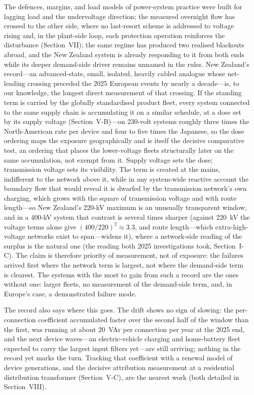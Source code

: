\documentclass[journal]{IEEEtran}
\begin{document}
The defences,
margins, and load models of power-system practice were built for lagging load and
the undervoltage direction; the measured overnight flow has crossed to the other
side, where no last-resort scheme is addressed to voltage rising and, in the
plant-side loop, each protection operation reinforces the disturbance
(Section~VII); the same regime
has produced two realised blackouts abroad, and the New Zealand system is
already responding to it from both ends while its deeper demand-side driver
remains unnamed in the rules. New Zealand's record---an advanced-state, small,
isolated, heavily cabled analogue whose net-leading crossing preceded the 2025
European events by nearly a decade---is, to our knowledge, the longest direct
measurement of that crossing. If the standing term is carried by the
globally standardised product fleet, every system connected to the same supply
chain is accumulating it on a similar schedule, at a dose set by its supply
voltage (Section~V-B)---on 230-volt systems roughly three times the
North-American rate per device and four to five times the Japanese, so the
dose ordering maps the exposure geographically and is itself the decisive
comparative test, an ordering that places the lower-voltage fleets
structurally later on the same accumulation, not exempt from it. Supply
voltage sets the dose; transmission voltage sets its visibility. The term is
created at the mains, indifferent to the network above it, while in any system-wide reactive account the boundary flow that would reveal it is dwarfed by the transmission network's own charging, which grows with the square of transmission voltage and with route length---so New Zealand's 220-kV maximum is an unusually transparent window, and in a 400-kV system that contrast is several times sharper
(against 220~kV the voltage terms alone give $(400/220)^2\approx3.3$, and
route length---which extra-high-voltage networks exist to span---widens it),
where a network-side reading of the surplus is the natural one (the reading
both 2025 investigations took, Section~I-C). The claim is therefore priority
of measurement, not of exposure: the failures arrived first where the network
term is largest, not where the demand-side term is clearest. The systems with
the most to gain from such a record
are the ones without one: larger fleets, no measurement of the demand-side
term, and, in Europe's case, a demonstrated failure mode.

The record also says where this goes. The drift shows no sign of slowing: the
per-connection coefficient accumulated faster over the second half of the
window than the first, was running at about 20~VAr per connection per year at
the 2025 end, and the next device waves---an electric-vehicle charging and
home-battery fleet expected to carry the largest input filters yet---are
still arriving; nothing in the record yet marks the turn. Tracking that
coefficient with a renewal model of device generations, and the decisive
attribution measurement at a residential distribution transformer
(Section~V-C), are the nearest work (both detailed in Section~VIII).
\end{document}
